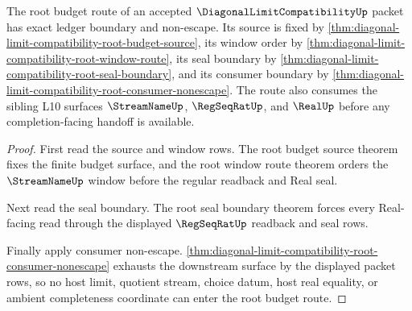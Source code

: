 \begin{theorem}
\label{thm:diagonal-limit-compatibility-root-budget-ledger-row}
The root budget route of an accepted $\DiagonalLimitCompatibilityUp$ packet has exact ledger boundary and non-escape. Its source is fixed by \autoref{thm:diagonal-limit-compatibility-root-budget-source}, its window order by \autoref{thm:diagonal-limit-compatibility-root-window-route}, its seal boundary by \autoref{thm:diagonal-limit-compatibility-root-seal-boundary}, and its consumer boundary by \autoref{thm:diagonal-limit-compatibility-root-consumer-nonescape}. The route also consumes the sibling L10 surfaces $\StreamNameUp$, $\RegSeqRatUp$, and $\RealUp$ before any completion-facing handoff is available.
\end{theorem}
\begin{proof}
First read the source and window rows. The root budget source theorem fixes the finite budget surface, and the root window route theorem orders the $\StreamNameUp$ window before the regular readback and Real seal.

Next read the seal boundary. The root seal boundary theorem forces every Real-facing read through the displayed $\RegSeqRatUp$ readback and seal rows.

Finally apply consumer non-escape. \autoref{thm:diagonal-limit-compatibility-root-consumer-nonescape} exhausts the downstream surface by the displayed packet rows, so no host limit, quotient stream, choice datum, host real equality, or ambient completeness coordinate can enter the root budget route.
\end{proof}

